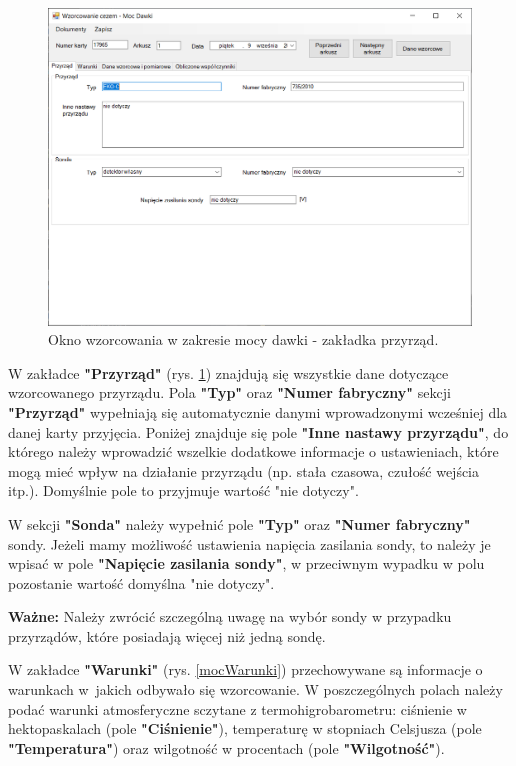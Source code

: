 \begin{figure}[htb]
	\centering
	\includegraphics[width=\columnwidth]{obrazki/Wzorcowanie/moc_dawki/przyrzad.png}
	\caption{Okno wzorcowania w zakresie mocy dawki - zakładka przyrząd.}
	\label{mocPrzyrzad}
\end{figure}

W zakładce \textbf{"Przyrząd"} (rys. \ref{mocPrzyrzad}) znajdują się wszystkie dane dotyczące wzorcowanego przyrządu. Pola \textbf{"Typ"} oraz \textbf{"Numer fabryczny"} sekcji \textbf{"Przyrząd"} wypełniają się automatycznie danymi wprowadzonymi wcześniej dla danej karty przyjęcia. Poniżej znajduje się pole \textbf{"Inne nastawy przyrządu"}, do którego należy wprowadzić wszelkie dodatkowe informacje o ustawieniach, które mogą mieć wpływ na działanie przyrządu (np. stała czasowa, czułość wejścia itp.). Domyślnie pole to przyjmuje wartość "nie dotyczy".
	
W sekcji \textbf{"Sonda"} należy wypełnić pole \textbf{"Typ"} oraz \textbf{"Numer fabryczny"} sondy. Jeżeli mamy możliwość ustawienia napięcia zasilania sondy, to należy je wpisać w pole \textbf{"Napięcie zasilania sondy"}, w przeciwnym wypadku w polu pozostanie wartość domyślna "nie dotyczy".

\textbf{Ważne:} Należy zwrócić szczególną uwagę na wybór sondy w przypadku przyrządów, które posiadają więcej niż jedną sondę.

W zakładce \textbf{"Warunki"} (rys. \ref{mocWarunki}) przechowywane są informacje o warunkach w~jakich odbywało się wzorcowanie. W poszczególnych polach należy podać warunki atmosferyczne sczytane z termohigrobarometru: ciśnienie w hektopaskalach (pole \textbf{"Ciśnienie"}), temperaturę w stopniach Celsjusza (pole \textbf{"Temperatura"}) oraz wilgotność w procentach (pole \textbf{"Wilgotność"}).

